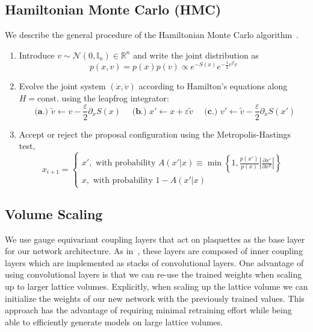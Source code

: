 \documentclass[a4paper,11pt]{article}
\begin{document}
\subsection{\label{subsec:hmc}Hamiltonian Monte Carlo (HMC)}
We describe the general procedure of the Hamiltonian Monte Carlo
algorithm~\cite{Betancourt:2017}.
\begin{enumerate}
    \item Introduce \(v \sim \mathcal{N} (0,\mathbb{I}_{n}) \in \mathbb{R}^{n}\)
        and write the joint distribution as
        \begin{equation}
            p(x, v) = p(x) p(v) \propto e^{-S(x)} e^{-\frac{1}{2} v^{T} v}
        \end{equation}
    \item Evolve the joint system \((\dot x, \dot v)\) according to
        Hamilton's equations along \(H=\text{const.}\) using the leapfrog
        integrator:
        \begin{equation}
            \textbf{ (a.)  } \tilde{v} \leftarrow v - \frac{\varepsilon}{2}\partial_{x}S(x)\quad
            \textbf{ (b.)  } x' \leftarrow x + \varepsilon \tilde{v}\quad
            \textbf{ (c.)  } v' \leftarrow \tilde{v} - \frac{\varepsilon}{2}\partial_{x} S(x')
        \end{equation}
    \item Accept or reject the proposal configuration using the
        Metropolis-Hastings test,
        \begin{equation}
            x_{i+1} = \begin{cases}
                x', \text{ with probability } 
                    A(x'|x) \equiv \min\left\{1, \frac{p(x')}{p(x)}%
                    \left|\frac{\partial x'}{\partial x^{T}}\right|\right\}\\
                x, \text{ with probability } 1 - A(x'|x)
            \end{cases}
        \end{equation}
\end{enumerate}
%
\subsection{\label{subsec:volume_scaling}Volume Scaling}
%
We use gauge equivariant coupling layers that act on plaquettes as the
base layer for our network architecture.
%
As in~\cite{Albergo:2021vyo}, these layers are composed of inner coupling
layers which are implemented as stacks of convolutional layers.
%
One advantage of using convolutional layers is that we can re-use the trained
weights when scaling up to larger lattice volumes.
%
Explicitly, when scaling up the lattice volume we can initialize the weights
of our new network with the previously trained values.
%
This approach has the advantage of requiring minimal retraining effort while
being able to efficiently generate models on large lattice volumes.
%
\end{document}
